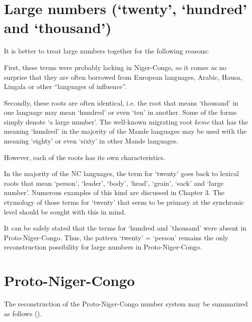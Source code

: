 \section{Large numbers (‘twenty’, ‘hundred’ and ‘thousand’)}%

It is better to treat large numbers together for the following reasons:

First, these terms were probably lacking in Niger-Congo, so it comes as no surprise that they are often borrowed from European languages, Arabic, Hausa, Lingala or other “languages of influence”.    

Secondly, these roots are often identical, i.e. the root that means ‘thousand’ in one language may mean ‘hundred’ or even ‘ten’ in another. Some of the forms simply denote ‘a large number’. The well-known migrating root \textit{keme} that has the meaning ‘hundred’ in the majority of the Mande languages may be used with the meaning ‘eighty’ or even ‘sixty’ in other Mande languages.

However, each of the roots has its own characteristics.

In the majority of the NC languages, the term for ‘twenty’ goes back to lexical roots that mean ‘person’, ‘leader’, ‘body’, ‘head’, ‘grain’, ‘sack’ and ‘large number’. Numerous examples of this kind are discussed in Chapter 3. The etymology of those terms for ‘twenty’ that seem to be primary at the synchronic level should be sought with this in mind.

It can be safely stated that the terms for ‘hundred and ’thousand’ were absent in Proto-Niger-Congo. Thus, the pattern ‘twenty’ = ‘person’ remains the only reconstruction possibility for large numbers in Proto-Niger-Congo.


\section{Proto-Niger-Congo}%

The reconstruction of the Proto-Niger-Congo number system may be summarized as follows ().

